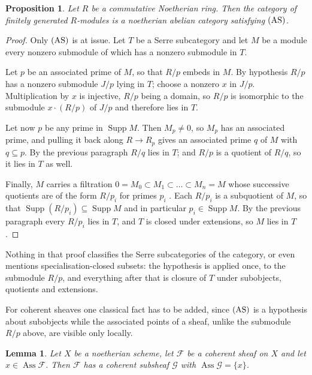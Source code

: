 \documentclass[reqno,a4paper]{amsart}
\numberwithin{equation}{section}
\theoremstyle{plain}
\newtheorem{proposition}[subsection]{Proposition}
\newtheorem{lemma}[subsection]{Lemma}
\theoremstyle{definition}
\renewcommand{\1}{\onecat{1}}
\DeclareMathOperator{\Supp}{Supp}
\DeclareMathOperator{\Ass}{Ass}
\newcommand{\AS}{\textup{(AS)}}
\begin{document}
\begin{proposition}\label{P:ModAS}
	Let \(R\) be a commutative Noetherian ring. Then the category of finitely generated \(R\)-modules is a noetherian abelian category satisfying \(\AS\).
\end{proposition}

\begin{proof}
	Only \(\AS\) is at issue. Let \(T\) be a Serre subcategory and let \(M\) be a module every nonzero submodule of which has a nonzero submodule in \(T\).

	Let \(p\) be an associated prime of \(M\), so that \(R/p\) embeds in \(M\). By hypothesis \(R/p\) has a nonzero submodule \(J/p\) lying in \(T\); choose a nonzero \(x\) in \(J/p\). Multiplication by \(x\) is injective, \(R/p\) being a domain, so \(R/p\) is isomorphic to the submodule \(x\cdot(R/p)\) of \(J/p\) and therefore lies in \(T\).

	Let now \(p\) be any prime in \(\Supp M\). Then \(M_{p}\neq0\), so \(M_{p}\) has an associated prime, and pulling it back along \(R\to R_{p}\) gives an associated prime \(q\) of \(M\) with \(q\subseteq p\). By the previous paragraph \(R/q\) lies in \(T\); and \(R/p\) is a quotient of \(R/q\), so it lies in \(T\) as well.

	Finally, \(M\) carries a filtration \(0=M_{0}\subset M_{1}\subset\dots\subset M_{n}=M\) whose successive quotients are of the form \(R/p_{i}\) for primes \(p_{i}\) \cite[Theorem~6.4]{Mat89}. Each \(R/p_{i}\) is a subquotient of \(M\), so that \(\Supp(R/p_{i})\subseteq\Supp M\) and in particular \(p_{i}\in\Supp M\). By the previous paragraph every \(R/p_{i}\) lies in \(T\), and \(T\) is closed under extensions, so \(M\) lies in \(T\).
\end{proof}

Nothing in that proof classifies the Serre subcategories of the category, or even mentions specialisation-closed subsets: the hypothesis is applied once, to the submodule \(R/p\), and everything after that is closure of \(T\) under subobjects, quotients and extensions.

For coherent sheaves one classical fact has to be added, since \(\AS\) is a hypothesis about subobjects while the associated points of a sheaf, unlike the submodule \(R/p\) above, are visible only locally.

\begin{lemma}\label{L:OneAss}
	Let \(X\) be a noetherian scheme, let \(\mathcal{F}\) be a coherent sheaf on \(X\) and let \(x\in\Ass\mathcal{F}\). Then \(\mathcal{F}\) has a coherent subsheaf \(\mathcal{G}\) with \(\Ass\mathcal{G}=\{x\}\).
\end{lemma}
\end{document}
